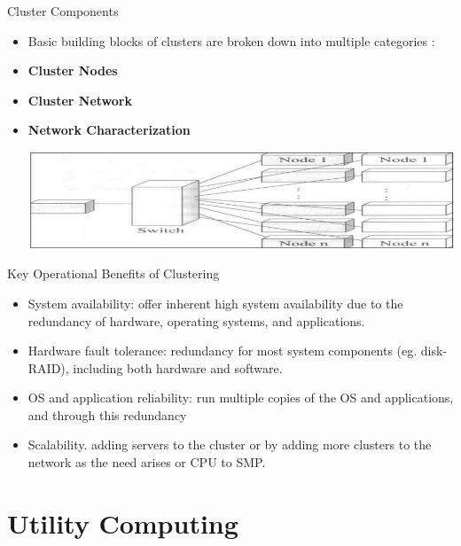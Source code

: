 \documentclass{SKP-beamer}
\begin{document}
\begin{frame}{Cluster Components}
	\begin{itemize}
		
		\item Basic building blocks of clusters are broken down into 
		multiple categories :
		\item \textbf{Cluster Nodes}
		\item \textbf{Cluster Network}
		\item \textbf{Network Characterization}
		
			\includegraphics[scale=0.5]{7.png}
		
		
	\end{itemize}
\end{frame}


\begin{frame}{Key Operational Benefits of Clustering}
	\begin{itemize}
		
		\item   System availability: offer inherent high system availability due to the redundancy of hardware, operating systems, and applications.
		\item Hardware fault tolerance: redundancy for most system 
		components (eg. disk-RAID), including both hardware and 
		software.
		\item OS and application reliability: run multiple copies of the OS	and applications, and through this redundancy
		\item Scalability. adding servers to the cluster or by adding more clusters to the network as the need arises or CPU to SMP.
		
	\end{itemize}
\end{frame}

\section{\textbf{Utility Computing}}
\end{document}
